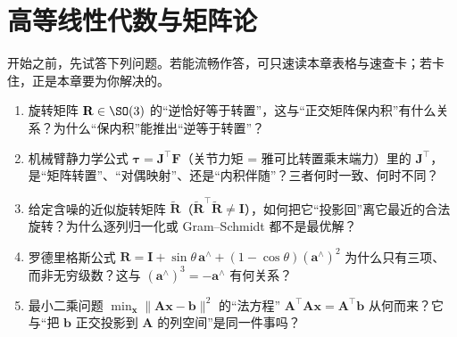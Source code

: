 \chapter{高等线性代数与矩阵论}
\label{ch:linalg}

\providecommand{\im}{\operatorname{im}}
\providecommand{\Hom}{\operatorname{Hom}}
\providecommand{\tr}{\operatorname{tr}}
\providecommand{\diag}{\operatorname{diag}}
\providecommand{\proj}{\operatorname{proj}}
\providecommand{\Exp}{\operatorname{Exp}}
\providecommand{\Log}{\operatorname{Log}}

\begin{practice}[前置自测]
开始之前，先试答下列问题。若能流畅作答，可只速读本章表格与速查卡；若卡住，正是本章要为你解决的。
\begin{enumerate}
  \item 旋转矩阵 $\mathbf{R}\in\SO(3)$ 的“逆恰好等于转置”，这与“正交矩阵保内积”有什么关系？为什么“保内积”能推出“逆等于转置”？
  \item 机械臂静力学公式 $\boldsymbol{\tau}=\mathbf{J}^\top\mathbf{F}$（关节力矩 = 雅可比转置乘末端力）里的 $\mathbf{J}^\top$，是“矩阵转置”、“对偶映射”、还是“内积伴随”？三者何时一致、何时不同？
  \item 给定含噪的近似旋转矩阵 $\tilde{\mathbf{R}}$（$\tilde{\mathbf{R}}^\top\tilde{\mathbf{R}}\neq\mathbf{I}$），如何把它“投影回”离它最近的合法旋转？为什么逐列归一化或 Gram--Schmidt 都不是最优解？
  \item 罗德里格斯公式 $\mathbf{R}=\mathbf{I}+\sin\theta\,\mathbf{a}^\wedge+(1-\cos\theta)(\mathbf{a}^\wedge)^2$ 为什么只有三项、而非无穷级数？这与 $(\mathbf{a}^\wedge)^3=-\mathbf{a}^\wedge$ 有何关系？
  \item 最小二乘问题 $\min_{\mathbf{x}}\|\mathbf{A}\mathbf{x}-\mathbf{b}\|^2$ 的“法方程” $\mathbf{A}^\top\mathbf{A}\mathbf{x}=\mathbf{A}^\top\mathbf{b}$ 从何而来？它与“把 $\mathbf{b}$ 正交投影到 $\mathbf{A}$ 的列空间”是同一件事吗？
\end{enumerate}
\end{practice}

